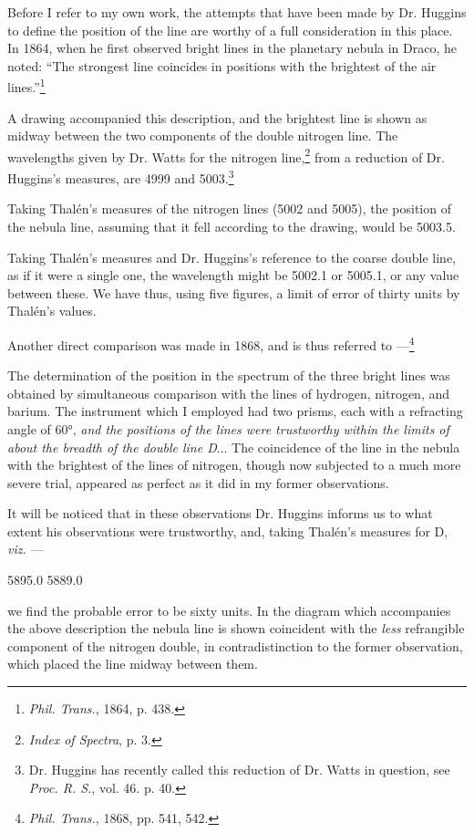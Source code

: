 \documentclass[a4paper, 12pt, oneside, polutonikogreek, english]{article}
\begin{document}
Before I refer to my own work, the attempts that have been made by Dr. Huggins to define the position of the line are worthy of a full consideration in this place. In 1864, when he first observed bright lines in the planetary nebula in Draco, he noted: ``The strongest line coincides in positions with the brightest of the air lines.''\footnote{\emph{Phil. Trans.}, 1864, p. 438.}

A drawing accompanied this description, and the brightest line is shown as midway between the two components of the double nitrogen line. The wavelengths given by Dr. Watts for the nitrogen line,\footnote{\emph{Index of Spectra}, p. 3.} from a reduction of Dr. Huggins's measures, are 4999 and 5003.\footnote{Dr. Huggins has recently called this reduction of Dr. Watts in question, see \emph{Proc. R. S.}, vol. 46. p. 40.}

Taking Thalén's measures of the nitrogen lines (5002 and 5005), the position of the nebula line, assuming that it fell according to the drawing, would be 5003.5.

Taking Thalén's measures and Dr. Huggins's reference to the coarse double line, as if it were a single one, the wavelength might be 5002.1 or 5005.1, or any value between these. We have thus, using five figures, a limit of error of thirty units by Thalén's values.

Another direct comparison was made in 1868, and is thus referred to ---\footnote{\emph{Phil. Trans.}, 1868, pp. 541, 542.}

The determination of the position in the spectrum of the three bright lines was obtained by simultaneous comparison with the lines of hydrogen, nitrogen, and barium. The instrument which I employed had two prisms, each with a refracting angle of 60°, \emph{and the positions of the lines were trustworthy within the limits of about the breadth of the double line D}... The coincidence of the line in the nebula with the brightest of the lines of nitrogen, though now subjected to a much more severe trial, appeared as perfect as it did in my former observations.

It will be noticed that in these observations Dr. Huggins informs us to what extent his observations were trustworthy, and, taking Thalén's measures for D, \emph{viz.} ---

5895.0 
5889.0

we find the probable error to be sixty units. In the diagram which accompanies the above description the nebula line is shown coincident with the \emph{less} refrangible component of the nitrogen double, in contradistinction to the former observation, which placed the line midway between them.
\end{document}
